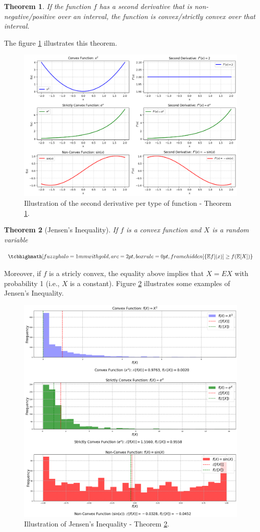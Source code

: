 \documentclass[a4paper,10pt]{article}
\newtheorem{theorem}{Theorem}
\newcommand{\equationgold}[1]{
  \tcbhighmath[fuzzy halo=1mm with gold,arc=2pt,boxrule=0pt,frame hidden]{#1}
}
\newcommand{\hlt}[1]{\colorbox{color3}{#1}}
\begin{document}
\begin{theorem}\label{theo:deriv_convex}
    If the function $f$ has a second derivative that is non-negative/positive over an interval, the function is convex/strictly convex over that interval.
\end{theorem}

The figure \ref{fig:convex_derivative} illustrates this theorem. 

\begin{figure}[ht]
    \centering
    \includegraphics[width=0.7\linewidth]{Figures/convex_derivative.png}
    \caption{Illustration of the second derivative per type of function - Theorem \ref{theo:deriv_convex}.}
    \label{fig:convex_derivative}
\end{figure}

\begin{theorem}[Jensen's Inequality]\label{theo:jensen}
    If $f$ is a \hlt{convex function} and $X$ is a random variable 

    \begin{equation}
        \equationgold{
            \mathbb{E}f[(x)] \geq f(\mathbb{E}[X])
        }
    \end{equation}
\end{theorem}

Moreover, if $f$ is a stricly convex, the equality above implies that $X = EX$ with probability 1 (i.e., $X$ is a constant). Figure \ref{fig:jessen_ine} illustrates some examples of Jensen's Inequality. 

\begin{figure}[ht]
    \centering
    \includegraphics[width=0.7\linewidth]{Figures/jessen_ine.png}
    \caption{Illustration of Jensen's Inequality - Theorem \ref{theo:jensen}.}
    \label{fig:jessen_ine}
\end{figure}
\end{document}

